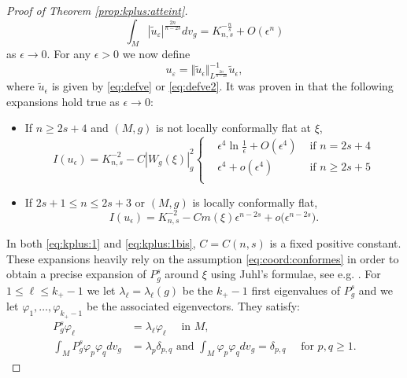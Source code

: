 \documentclass[10pt]{amsart}
\numberwithin{equation}{section}
\def\ep{{\varepsilon}}
\newcommand{\ve}{\varepsilon}
\newcommand{\vp}{\varphi}
\def \ep{\epsilon}
\theoremstyle{plain}
\theoremstyle{remark}
\begin{document}
\begin{proof}[Proof of Theorem \ref{prop:kplus:atteint}]
\begin{equation} \label{eq:kplus:4}
\int_{M} |\tilde{u}_{\ve}|^{\frac{2n}{n-2s}}dv_g = K_{n,s}^{-\frac{n}{s}} + O(\ep^{n})
\end{equation} 
as $\ep \to 0$. For any $\ep >0$ we now define
  \begin{equation} \label{eq:kplus:3}
 u_\ve = \Vert \tilde{u}_{\ep} \Vert_{L^{\frac{2n}{n-2s}}}^{-1} \tilde{u}_\ep,
   \end{equation} 
   where $\tilde{u}_\ep$ is given by \eqref{eq:defve} or \eqref{eq:defve2}. It was proven in \cite[Proposition 2.1, Proposition 3.1 ]{MazumdarVetois} that the following expansions hold true as $\ep \to 0$: 
 \begin{itemize}
 \item If  $n \ge 2s+4$ and $(M,g)$ is not locally conformally flat at $\xi$, 
\begin{equation} \label{eq:kplus:1}
I(u_\ep) =K_{n,s}^{-2} - C |W_g(\xi)|_g^2 \left\{  
\begin{aligned}
& \ep^4 \ln \frac{1}{\ep} + O(\ep^4) & \text{ if } n = 2s+4 \\
& \ep^4  + o(\ep^4) & \text{ if } n \ge 2s+5 \\
\end{aligned}\right. 
\end{equation}
\item If $2s+1 \le n \le 2s+3$ or $(M,g)$ is locally conformally flat,
\begin{equation} \label{eq:kplus:1bis}
I(u_\ep) =K_{n,s}^{-2} - C m(\xi) \ep^{n-2s} + o \big( \ep^{n-2s} \big).
\end{equation}
\end{itemize}
In both \eqref{eq:kplus:1} and \eqref{eq:kplus:1bis}, $C = C(n,s)$ is a fixed positive constant. These expansions heavily rely on the assumption \eqref{eq:coord:conformes} in order to obtain a precise expansion of $P_g^s$ around $\xi$ using Juhl's formulae, see e.g.  \cite[Step 2.1]{MazumdarVetois}.  For $1 \le \ell \le k_+-1$ we let $\lambda_\ell = \lambda_{\ell}(g)$ be the $k_+-1$ first eigenvalues of $P_g^s$ and we let $\vp_1, \dots, \vp_{k_+-1}$ be the associated eigenvectors. They satisfy:  
 \begin{equation} \label{eq:kplus:2} 
 \begin{aligned}   
 P_g^s \vp_\ell & =  \lambda_\ell \vp_\ell \quad \text{ in } M, \\
  	\int_{M} P_g^s \vp_p \vp_q  dv_g & = \lambda_p \delta_{p, q} \text{ and }  \int_M \varphi_{p} \varphi_{q} dv_g =  \delta_{p, q} \quad \text{ for } p, q\geq 1.

\end{aligned}
\end{equation}
\end{proof}
\end{document}
